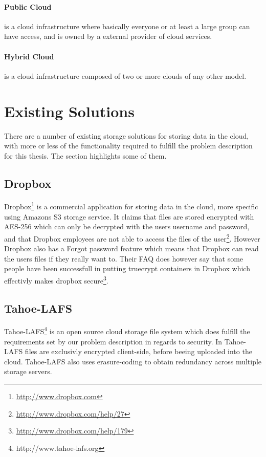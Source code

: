 \documentclass[english,12pt,a4paper]{book}
\begin{document}
\paragraph{Public Cloud} is a cloud infrastructure where basically everyone or
at least a large group can have access, and is owned by a external provider of
cloud services.

\paragraph{Hybrid Cloud} is a cloud infrastructure composed of two or more
clouds of any other model. 

\section{Existing Solutions}
There are a number of existing storage solutions for storing data in the cloud,
with more or less of the functionality required to fulfill the problem
description for this thesis. The section highlights some of them.

\subsection{Dropbox} Dropbox\footnote{\url{http://www.dropbox.com}} is a
commercial application for storing data in the cloud, more specific using
Amazons S3 storage service. It claims that files are stored encrypted with
\ac{AES}-256 which can only be decrypted with the users username and password,
and that Dropbox employees are not able to access the files of the
user\footnote{\url{http://www.dropbox.com/help/27}}. However Dropbox also has a
Forgot password feature which means that Dropbox can read the users files if
they really want to. Their \ac{FAQ} does however say that some people have been
successfull in putting truecrypt containers in Dropbox which effectivly makes
dropbox secure\footnote{\url{http://www.dropbox.com/help/179}}.

\subsection{Tahoe-LAFS}
Tahoe-\ac{LAFS}\footnote{http://www.tahoe-lafs.org} is an open source
cloud storage file system which does fulfill the requirements set by our
problem description in regards to security. In Tahoe-\ac{LAFS} files are
exclusivly encrypted client-side, before beeing uploaded into the cloud.
Tahoe-\ac{LAFS} also uses erasure-coding to obtain redundancy across multiple
storage servers.  
\end{document}

